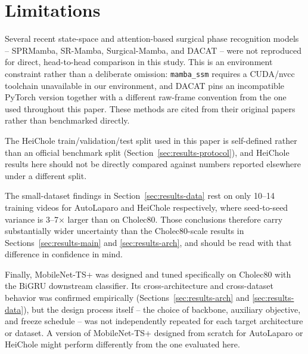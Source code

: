 \documentclass[preprint,12pt]{elsarticle}
\begin{document}
\section{Limitations}
\label{sec:limitations}

Several recent state-space and attention-based surgical phase recognition models -- SPRMamba, SR-Mamba, Surgical-Mamba, and DACAT -- were not reproduced for direct, head-to-head comparison in this study. This is an environment constraint rather than a deliberate omission: \texttt{mamba\_ssm} requires a CUDA/nvcc toolchain unavailable in our environment, and DACAT pins an incompatible PyTorch version together with a different raw-frame convention from the one used throughout this paper. These methods are cited from their original papers rather than benchmarked directly.

The HeiChole train/validation/test split used in this paper is self-defined rather than an official benchmark split (Section~\ref{sec:results-protocol}), and HeiChole results here should not be directly compared against numbers reported elsewhere under a different split.

The small-dataset findings in Section~\ref{sec:results-data} rest on only 10--14 training videos for AutoLaparo and HeiChole respectively, where seed-to-seed variance is 3--7$\times$ larger than on Cholec80. Those conclusions therefore carry substantially wider uncertainty than the Cholec80-scale results in Sections~\ref{sec:results-main} and \ref{sec:results-arch}, and should be read with that difference in confidence in mind.

Finally, MobileNet-TS+ was designed and tuned specifically on Cholec80 with the BiGRU downstream classifier. Its cross-architecture and cross-dataset behavior was confirmed empirically (Sections~\ref{sec:results-arch} and \ref{sec:results-data}), but the design process itself -- the choice of backbone, auxiliary objective, and freeze schedule -- was not independently repeated for each target architecture or dataset. A version of MobileNet-TS+ designed from scratch for AutoLaparo or HeiChole might perform differently from the one evaluated here.
\end{document}
